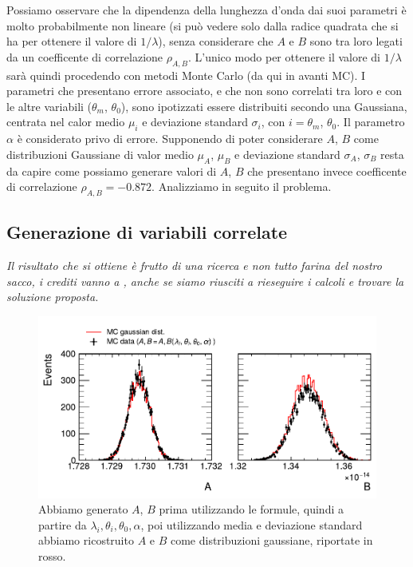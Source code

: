\documentclass[a4paper,aps,12pt,tightenlines]{revtex4-2}
\begin{document}
Possiamo osservare che la dipendenza della lunghezza d'onda dai suoi parametri è molto probabilmente non lineare (si può vedere solo dalla radice quadrata che si ha per ottenere il valore di $1/\lambda$), senza considerare che $A$ e $B$ sono tra loro legati da un coefficente di correlazione $\rho_{A,B}$. L'unico modo per ottenere il valore di $1/\lambda$ sarà quindi procedendo con metodi Monte Carlo (da qui in avanti MC). I parametri che presentano errore associato, e che non sono correlati tra loro e con le altre variabili ($\theta_m$, $\theta_0$), sono ipotizzati essere distribuiti secondo una Gaussiana, centrata nel calor medio $\mu_i$ e deviazione standard $\sigma_i$, con $i=\theta_m$, $\theta_0$. Il parametro $\alpha$ è considerato privo di errore. Supponendo di poter considerare $A$, $B$ come distribuzioni Gaussiane di valor medio $\mu_A$, $\mu_B$ e deviazione standard $\sigma_A$, $\sigma_B$ resta da capire come possiamo generare valori di $A$, $B$ che presentano invece coefficente di correlazione $\rho_{A,B} = \num{-0.872}$. Analizziamo in seguito il problema.

\subsection{Generazione di variabili correlate}
\emph{Il risultato che si ottiene è frutto di una ricerca e non tutto farina del nostro sacco, i crediti vanno a \cite{anthonyAnswerHowDoes2015, sobolevAnswerHowDoes2015, kaiserSamplePopulationScore1962}, anche se siamo riusciti a rieseguire i calcoli e trovare la soluzione proposta. }

\begin{figure}
\centering
\includegraphics{../figures_and_tests/gaus_compAB.pdf}
\caption{Abbiamo generato $A$, $B$ prima utilizzando le formule, quindi a partire da $\lambda_i, \theta_i, \theta_0, \alpha$, poi utilizzando media e deviazione standard abbiamo ricostruito $A$ e $B$ come distribuzioni gaussiane, riportate in rosso.}
\end{figure}
\end{document}
